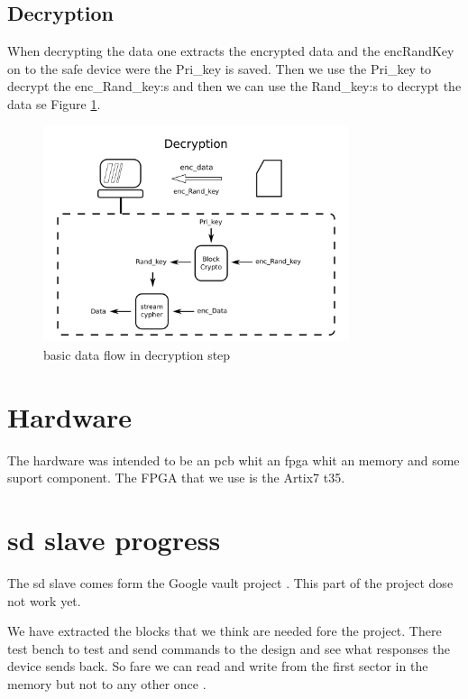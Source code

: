\documentclass[]{article}
\begin{document}
\subsection{Decryption}
When decrypting the data one extracts the encrypted data and the \acrfull{encRandKey} on to the safe device were the Pri\_key is saved.
Then we use the Pri\_key to decrypt the enc\_Rand\_key:s and then we can use the Rand\_key:s to decrypt the data se Figure \ref{fig:decrypt}.

\begin{figure}[h]
	\centering
	\includegraphics[width=0.8\textwidth]{ilustrations/decryption.pdf}
	\caption{basic data flow in decryption step}
	\label{fig:decrypt}
\end{figure}



\section{Hardware}
The hardware was intended to be an \acrfull{pcb} whit an \acrfull{fpga} whit an memory and some suport component.
The FPGA that we use is the Artix7 t35.


\section{sd slave progress}
The sd slave comes form the Google vault project \cite{GV}.
This part of the project dose not work yet.

We have extracted the blocks that we think are needed fore the project.
There test bench to test and send commands to the design and see what responses the device sends back.
So fare we can read and write from the first sector in the memory but not to any other once . 
\end{document}
